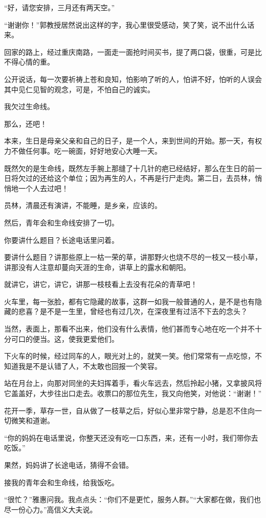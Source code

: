 \par “好，请您安排，三月还有两天空。”
\par “谢谢你！”郭教授居然说出这样的字，我心里很受感动，笑了笑，说不出什么话来。
\par 回家的路上，经过重庆南路，一面走一面抢时间买书，提了两口袋，很重，可是比不得心情的重。
\par 公开说话，每一次要祈祷上苍和良知，怕影响了听的人，怕讲不好，怕听的人误会其中见仁见智的观念，可是，不怕自己的诚实。
\par 我欠过生命线。
\par 那么，还吧！
\par 本来，生日是母亲父亲和自己的日子，是一个人，来到世间的开始。那一天，有权力不做任何事。吃一碗面，好好地安心大睡一天。
\par 既然欠的是生命线，既然左手腕上那缝了十几针的疤已经结好，那么在生日的前一日将欠过的还给这个单位；因为再生的人，不再是行尸走肉。第二日，去员林，悄悄地一个人去过吧！
\par 员林，清晨还有演讲，不能睡，是乡亲，应该的。
\par 然后，青年会和生命线安排了一切。
\par 你要讲什么题目？长途电话里问着。
\par 要讲什么题目？讲那些原上一枯一荣的草，讲那野火也烧不尽的一枝又一枝小草，讲那没有人注意却蔓向天涯的生命，讲草上的露水和朝阳。
\par 就讲它，讲它，讲它，讲那一枝枝看上去没有花朵的青草吧！
\par 火车里，每一张脸，都有它隐藏的故事，这群一如我一般普通的人，是不是也有隐藏的悲喜？是不是一生里，曾经也有过几次，在深夜里有过活不下去的念头？
\par 当然，表面上，那看不出来，他们没有什么表情，他们甚而专心地在吃一个并不十分可口的便当。这，使我更爱他们。
\par 下火车的时候，经过同车的人，眼光对上的，就笑一笑。他们常常有一点吃惊，不知道我是不是认错了人，不太敢也回报一个笑容。
\par 站在月台上，向那对同坐的夫妇挥着手，看火车远去，然后拎起小猪，又拿披风将它盖盖好，大步往出口走去。收票口的那位先生，我又向他笑，对他说：“谢谢！”
\par 花开一季，草存一世，自从做了一枝草之后，好似心里非常宁静，总是忍不住向一切微笑和道谢。
\par “你的妈妈在电话里说，你整天还没有吃一口东西，来，还有一小时，我们带你去吃饭。”
\par 果然，妈妈讲了长途电话，猜得不会错。
\par 接我的青年会和生命线，给我饭吃。
\par “很忙？”雅惠问我。我点点头：“你们不是更忙，服务人群。”“大家都在做，我们也尽一份心力。”高信义大夫说。
